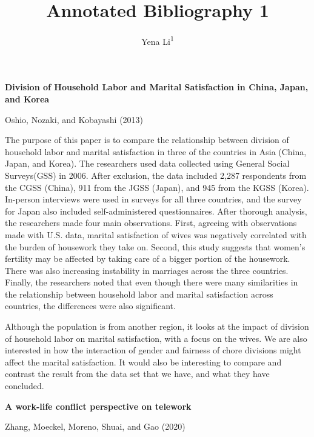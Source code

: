 \documentclass[
  english,
  man]{apa6}
\title{Annotated Bibliography 1}
\author{Yena Li\textsuperscript{1}}
\date{}
\affiliation{\vspace{0.5cm}\textsuperscript{1} Smith College}
\begin{document}
\maketitle

\textbf{Division of Household Labor and Marital Satisfaction in China, Japan, and Korea}

Oshio, Nozaki, and Kobayashi (2013)

The purpose of this paper is to compare the relationship between division of household labor and marital satisfaction in three of the countries in Asia (China, Japan, and Korea). The researchers used data collected using General Social Surveys(GSS) in 2006. After exclusion, the data included 2,287 respondents from the CGSS (China), 911 from the JGSS (Japan), and 945 from the KGSS (Korea). In-person interviews were used in surveys for all three countries, and the survey for Japan also included self-administered questionnaires. After thorough analysis, the researchers made four main observations. First, agreeing with observations made with U.S. data, marital satisfaction of wives was negatively correlated with the burden of housework they take on. Second, this study suggests that women's fertility may be affected by taking care of a bigger portion of the housework. There was also increasing instability in marriages across the three countries. Finally, the researchers noted that even though there were many similarities in the relationship between household labor and marital satisfaction across countries, the differences were also significant.

Although the population is from another region, it looks at the impact of division of household labor on marital satisfaction, with a focus on the wives. We are also interested in how the interaction of gender and fairness of chore divisions might affect the marital satisfaction. It would also be interesting to compare and contrast the result from the data set that we have, and what they have concluded.

\textbf{A work-life conflict perspective on telework}

Zhang, Moeckel, Moreno, Shuai, and Gao (2020)
\end{document}
